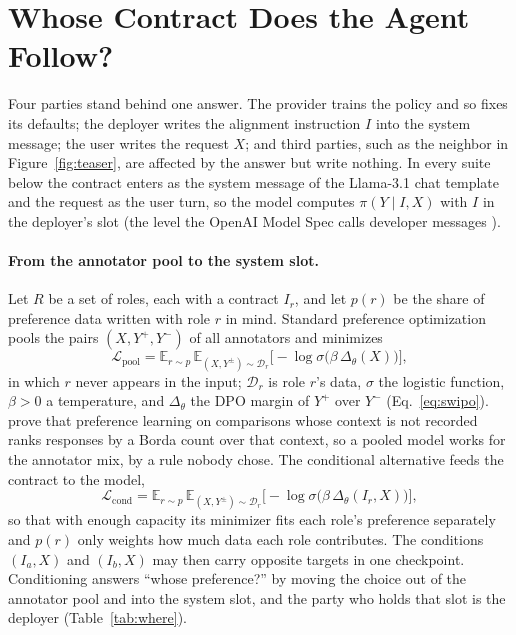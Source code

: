 \documentclass[letterpaper]{article} %
\begin{document}
\section{Whose Contract Does the Agent Follow?}
\label{sec:loyalty}

Four parties stand behind one answer. The provider trains the policy and so fixes its defaults; the deployer writes the alignment instruction $I$ into the system message; the user writes the request $X$; and third parties, such as the neighbor in Figure~\ref{fig:teaser}, are affected by the answer but write nothing. In every suite below the contract enters as the system message of the Llama-3.1 chat template and the request as the user turn, so the model computes $\pi(Y\mid I, X)$ with $I$ in the deployer's slot (the level the OpenAI Model Spec calls developer messages \cite{openai2025modelspec}).

\paragraph{From the annotator pool to the system slot.}
Let $R$ be a set of roles, each with a contract $I_r$, and let $p(r)$ be the share of preference data written with role $r$ in mind. Standard preference optimization pools the pairs $(X, Y^+, Y^-)$ of all annotators and minimizes
\begin{equation}
\label{eq:pool}
\mathcal{L}_{\mathrm{pool}} = \mathbb{E}_{r\sim p}\,\mathbb{E}_{(X,Y^{\pm})\sim\mathcal{D}_r}\big[-\log\sigma\big(\beta\,\Delta_\theta(X)\big)\big],
\end{equation}
in which $r$ never appears in the input; $\mathcal{D}_r$ is role $r$'s data, $\sigma$ the logistic function, $\beta>0$ a temperature, and $\Delta_\theta$ the DPO margin of $Y^+$ over $Y^-$ (Eq.~\ref{eq:swipo}). \citet{siththaranjan2024distributional} prove that preference learning on comparisons whose context is not recorded ranks responses by a Borda count over that context, so a pooled model works for the annotator mix, by a rule nobody chose. The conditional alternative feeds the contract to the model,
\begin{equation}
\label{eq:cond}
\mathcal{L}_{\mathrm{cond}} = \mathbb{E}_{r\sim p}\,\mathbb{E}_{(X,Y^{\pm})\sim\mathcal{D}_r}\big[-\log\sigma\big(\beta\,\Delta_\theta(I_r, X)\big)\big],
\end{equation}
so that with enough capacity its minimizer fits each role's preference separately and $p(r)$ only weights how much data each role contributes. The conditions $(I_a, X)$ and $(I_b, X)$ may then carry opposite targets in one checkpoint. Conditioning answers ``whose preference?'' by moving the choice out of the annotator pool and into the system slot, and the party who holds that slot is the deployer (Table~\ref{tab:where}).
\end{document}
